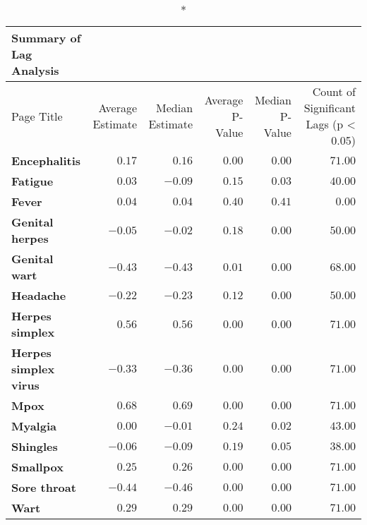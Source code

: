 \begin{longtable}{lrrrrr}
\caption*{
{\large \textbf{Summary of Lag Analysis}}
} \\ 
\toprule
Page Title & Average Estimate & Median Estimate & Average P-Value & Median P-Value & Count of Significant Lags (p < 0.05) \\ 
\midrule\addlinespace[2.5pt]
\textbf{Encephalitis} & $0.17$ & $0.16$ & $0.00$ & $0.00$ & $71.00$ \\ 
\textbf{Fatigue} & $0.03$ & $-0.09$ & $0.15$ & $0.03$ & $40.00$ \\ 
\textbf{Fever} & $0.04$ & $0.04$ & $0.40$ & $0.41$ & $0.00$ \\ 
\textbf{Genital herpes} & $-0.05$ & $-0.02$ & $0.18$ & $0.00$ & $50.00$ \\ 
\textbf{Genital wart} & $-0.43$ & $-0.43$ & $0.01$ & $0.00$ & $68.00$ \\ 
\textbf{Headache} & $-0.22$ & $-0.23$ & $0.12$ & $0.00$ & $50.00$ \\ 
\textbf{Herpes simplex} & $0.56$ & $0.56$ & $0.00$ & $0.00$ & $71.00$ \\ 
\textbf{Herpes simplex virus} & $-0.33$ & $-0.36$ & $0.00$ & $0.00$ & $71.00$ \\ 
\textbf{Mpox} & $0.68$ & $0.69$ & $0.00$ & $0.00$ & $71.00$ \\ 
\textbf{Myalgia} & $0.00$ & $-0.01$ & $0.24$ & $0.02$ & $43.00$ \\ 
\textbf{Shingles} & $-0.06$ & $-0.09$ & $0.19$ & $0.05$ & $38.00$ \\ 
\textbf{Smallpox} & $0.25$ & $0.26$ & $0.00$ & $0.00$ & $71.00$ \\ 
\textbf{Sore throat} & $-0.44$ & $-0.46$ & $0.00$ & $0.00$ & $71.00$ \\ 
\textbf{Wart} & $0.29$ & $0.29$ & $0.00$ & $0.00$ & $71.00$ \\ 
\bottomrule
\end{longtable}

